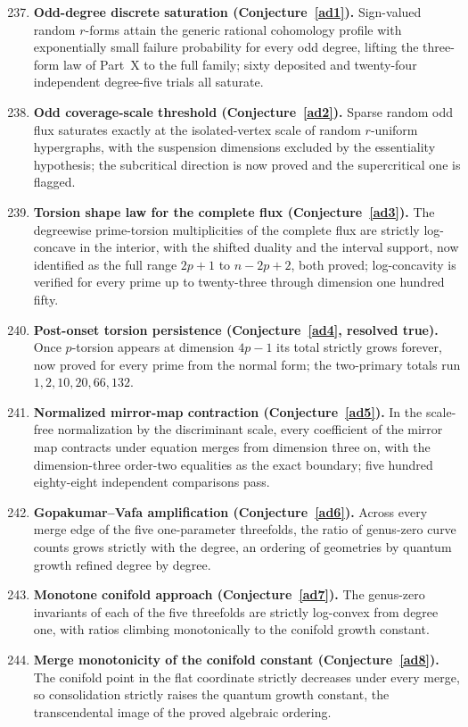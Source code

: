 \documentclass[11pt]{article}
\theoremstyle{definition}
\begin{document}
\begin{enumerate}\setcounter{enumi}{236}
\item \textbf{Odd-degree discrete saturation (Conjecture~\ref{ad1}).}  Sign-valued random $r$-forms attain the generic rational cohomology profile with exponentially small failure probability for every odd degree, lifting the three-form law of Part~X to the full family; sixty deposited and twenty-four independent degree-five trials all saturate.
\item \textbf{Odd coverage-scale threshold (Conjecture~\ref{ad2}).}  Sparse random odd flux saturates exactly at the isolated-vertex scale of random $r$-uniform hypergraphs, with the suspension dimensions excluded by the essentiality hypothesis; the subcritical direction is now proved and the supercritical one is flagged.
\item \textbf{Torsion shape law for the complete flux (Conjecture~\ref{ad3}).} The degreewise prime-torsion multiplicities of the complete flux are strictly log-concave in the interior, with the shifted duality and the interval support, now identified as the full range $2p+1$ to $n-2p+2$, both proved; log-concavity is verified for every prime up to twenty-three through dimension one hundred fifty.
\item \textbf{Post-onset torsion persistence (Conjecture~\ref{ad4}, resolved true).} Once $p$-torsion appears at dimension $4p-1$ its total strictly grows forever, now proved for every prime from the normal form; the two-primary totals run $1,2,10,20,66,132$.
\item \textbf{Normalized mirror-map contraction (Conjecture~\ref{ad5}).}  In the scale-free normalization by the discriminant scale, every coefficient of the mirror map contracts under equation merges from dimension three on, with the dimension-three order-two equalities as the exact boundary; five hundred eighty-eight independent comparisons pass.
\item \textbf{Gopakumar--Vafa amplification (Conjecture~\ref{ad6}).}  Across every merge edge of the five one-parameter threefolds, the ratio of genus-zero curve counts grows strictly with the degree, an ordering of geometries by quantum growth refined degree by degree.
\item \textbf{Monotone conifold approach (Conjecture~\ref{ad7}).}  The genus-zero invariants of each of the five threefolds are strictly log-convex from degree one, with ratios climbing monotonically to the conifold growth constant.
\item \textbf{Merge monotonicity of the conifold constant (Conjecture~\ref{ad8}).}  The conifold point in the flat coordinate strictly decreases under every merge, so consolidation strictly raises the quantum growth constant, the transcendental image of the proved algebraic ordering.

\end{enumerate}
\end{document}
